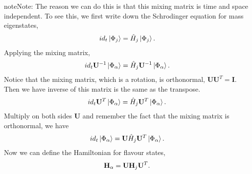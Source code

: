 \documentclass[letterpaper,12pt,english]{sphinxmanual}
\newcommand{\ket}[1]{\left| #1\right\rangle}
\begin{document}
\begin{notice}{note}{Note:}
The reason we can do this is that this mixing matrix is time and space independent. To see this, we first write down the Schrodinger equation for mass eigenstates,
\begin{gather}
\begin{split}i d_t \ket{\Phi_j} = \hat H_j \ket{\Phi_j}.\end{split}\notag
\end{gather}
Applying the mixing matrix,
\begin{gather}
\begin{split}i d_t \mathbf U^{-1} \ket{\Phi_\alpha} = \hat H_j  \mathbf U^{-1} \ket{\Phi_\alpha}.\end{split}\notag
\end{gather}
Notice that the mixing matrix, which is a rotation, is orthonormal, \(\mathbf U \mathbf U^T=\mathbf I\). Then we have inverse of this matrix is the same as the transpose.
\begin{gather}
\begin{split}i d_t \mathbf U^T \ket{\Phi_\alpha} = \hat H_j  \mathbf U^T \ket{\Phi_\alpha}.\end{split}\notag
\end{gather}
Multiply on both sides \(\mathbf U\) and remember the fact that the mixing matrix is orthonormal, we have
\begin{gather}
\begin{split}i d_t \ket{\Phi_\alpha} = \mathbf U \hat H_j  \mathbf U^T \ket{\Phi_\alpha}.\end{split}\notag
\end{gather}
Now we can define the Hamiltonian for flavour states,
\begin{gather}
\begin{split}\mathbf H_{\alpha} = \mathbf U \mathbf H_j  \mathbf U^T .\end{split}\notag
\end{gather}\end{notice}
\end{document}
